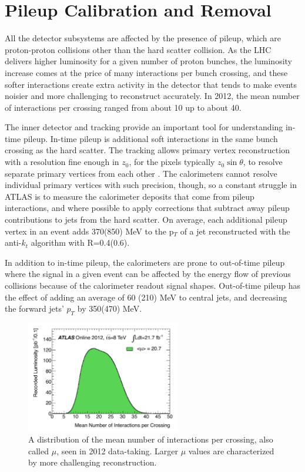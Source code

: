 
\section{Pileup Calibration and Removal}
\label{sec:pileup}
All the detector subsystems are affected by the presence of pileup, which are proton-proton collisions other than the hard scatter 
collision.  As the LHC delivers higher luminosity for a given number of proton bunches, the luminosity increase comes 
at the price of many interactions per bunch crossing, and these softer interactions create extra activity in the detector 
that tends to make events noisier and more challenging to reconstruct accurately.  In 2012, the mean number of 
interactions per crossing ranged from about 10 up to about 40.  

The inner detector and tracking provide an important tool for understanding in-time pileup.  In-time pileup 
is additional soft interactions in the same bunch crossing as the hard scatter.  The tracking allows primary vertex reconstruction 
with a resolution fine enough in $z_0$, for the pixels typically $z_0\sin\theta$, 
to resolve separate primary vertices from each other \cite{pileup_tracks}.   The calorimeters cannot resolve individual primary vertices with such precision, 
though, so a constant struggle in ATLAS is to measure the calorimeter deposits that come from pileup interactions, 
and where possible to apply corrections that subtract away pileup contributions to jets from the hard scatter.  On average,
each additional pileup vertex in an event adds 370(850) \cite{pileup} 
MeV to the p$_T$ of a jet reconstructed with the anti-$k_t$ algorithm with R=0.4(0.6).

In addition to in-time pileup, the calorimeters are prone to out-of-time pileup where 
the signal in a given event can be affected by the energy flow of previous collisions because of the 
calorimeter readout signal shapes.  Out-of-time pileup has the effect of adding an average of 60
(210) MeV to central jets, and decreasing the forward jets' $p_T$ by 350(470) MeV.  


\begin{figure}
    \center
	\includegraphics[width=0.6\textwidth]{ReconstructionPerformance/images/mu_2012-dec.pdf}
	\caption{A distribution of the mean number of interactions per crossing, also called $\mu$, seen in 2012 data-taking.  Larger $\mu$ values are characterized by more challenging reconstruction. 	\label{fig:mu_2012}  }
\end{figure}

